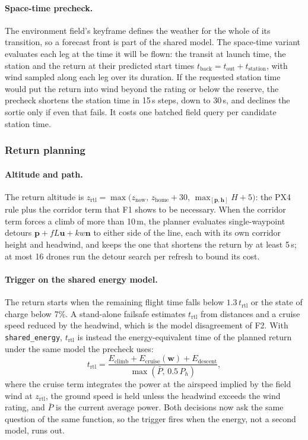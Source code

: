 \paragraph{Space-time precheck.} The environment field's keyframe defines the weather for the whole of its transition,
so a forecast front is part of the shared model. The space-time variant evaluates each leg at the time it will be
flown: the transit at launch time, the station and the return at their predicted start times $t_{\mathrm{back}} =
t_{\mathrm{out}} + t_{\mathrm{station}}$, with wind sampled along each leg over its duration. If the requested station
time would put the return into wind beyond the rating or below the reserve, the precheck shortens the station time in
15\,s steps, down to 30\,s, and declines the sortie only if even that fails. It costs one batched field query per
candidate station time.

\subsubsection{Return planning}

\paragraph{Altitude and path.} The return altitude is
$z_{\mathrm{rtl}} = \max\big(z_{\mathrm{now}},\, z_{\mathrm{home}} + 30,\, \max_{[\mathbf{p},\mathbf{h}]} H + 5\big)$:
the PX4 rule plus the corridor term that F1 shows to be necessary. When the corridor term forces a climb of more than
10\,m, the planner evaluates single-waypoint detours $\mathbf{p} + fL\mathbf{u} + kw\mathbf{n}$ to either side of the
line, each with its own corridor height and headwind, and keeps the one that shortens the return by at least 5\,s; at
most 16 drones run the detour search per refresh to bound its cost.

\paragraph{Trigger on the shared energy model.} The return starts when the remaining flight time falls below
$1.3\,t_{\mathrm{rtl}}$ or the state of charge below 7\%. A stand-alone failsafe estimates $t_{\mathrm{rtl}}$ from
distances and a cruise speed reduced by the headwind, which is the model disagreement of F2. With
\texttt{shared\_energy}, $t_{\mathrm{rtl}}$ is instead the energy-equivalent time of the planned return under the same
model the precheck uses:
\begin{equation}
t_{\mathrm{rtl}} = \frac{E_{\mathrm{climb}} + E_{\mathrm{cruise}}(\mathbf{w}) + E_{\mathrm{descent}}}{\max(\bar P,\, 0.5\,P_h)},
\end{equation}
where the cruise term integrates the power at the airspeed implied by the field wind at $z_{\mathrm{rtl}}$, the ground
speed is held unless the headwind exceeds the wind rating, and $\bar P$ is the current average power. Both decisions
now ask the same question of the same function, so the trigger fires when the energy, not a second model, runs out.

